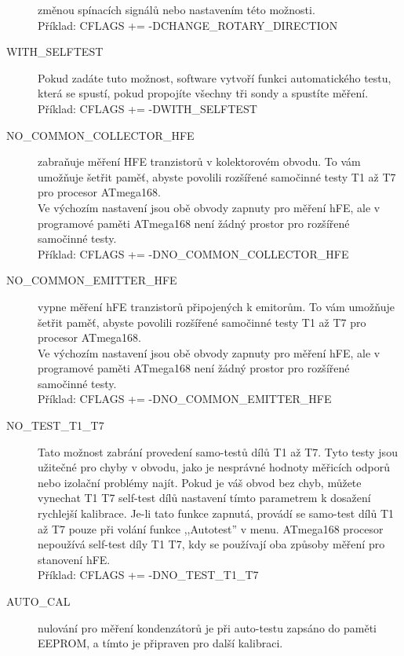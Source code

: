 \begin{description}
změnou spínacích signálů nebo nastavením této možnosti.\\
Příklad: CFLAGS += -DCHANGE\_ROTARY\_DIRECTION
\vspace{-0,3cm}
 \item[WITH\_SELFTEST]  Pokud zadáte tuto možnost, software vytvoří funkci automatického testu, která se spustí,
pokud propojíte všechny tři sondy a spustíte měření.\\
Příklad: CFLAGS += -DWITH\_SELFTEST
\vspace{-0,3cm}
  \item[NO\_COMMON\_COLLECTOR\_HFE]  zabraňuje měření HFE tranzistorů v kolektorovém obvodu.
To vám umožňuje šetřit paměť, abyste povolili rozšířené samočinné testy T1 až T7 pro procesor ATmega168.\\
Ve výchozím nastavení jsou obě obvody zapnuty pro měření hFE,
ale v programové paměti ATmega168 není žádný prostor pro rozšířené samočinné testy.\\
Příklad: CFLAGS += -DNO\_COMMON\_COLLECTOR\_HFE
\vspace{-0,3cm}
  \item[NO\_COMMON\_EMITTER\_HFE] vypne měření hFE tranzistorů připojených k emitorům.
To vám umožňuje šetřit paměť, abyste povolili rozšířené samočinné testy T1 až T7 pro procesor ATmega168.\\
Ve výchozím nastavení jsou obě obvody zapnuty pro měření hFE,
ale v programové paměti ATmega168 není žádný prostor pro rozšířené samočinné testy.\\
Příklad: CFLAGS += -DNO\_COMMON\_EMITTER\_HFE
\vspace{-0,3cm}
  \item[NO\_TEST\_T1\_T7] Tato možnost zabrání provedení samo-testů dílů T1 až T7.
Tyto testy jsou užitečné pro chyby v obvodu, jako je nesprávné hodnoty měřicích odporů nebo izolační problémy  najít.
Pokud je váš obvod bez chyb, můžete vynechat T1 T7 self-test dílů nastavení tímto parametrem k dosažení rychlejší kalibrace.
Je-li tato funkce zapnutá, provádí se samo-test dílů T1 až T7 pouze při volání funkce  ,,Autotest'' v menu.
ATmega168 procesor nepoužívá self-test díly T1 T7, kdy se používají oba způsoby měření pro stanovení hFE.\\
Příklad: CFLAGS += -DNO\_TEST\_T1\_T7
\vspace{-0,3cm}
  \item[AUTO\_CAL] nulování pro měření kondenzátorů je při auto-testu zapsáno do paměti EEPROM, a tímto je připraven pro další kalibraci.\\

\end{description}
